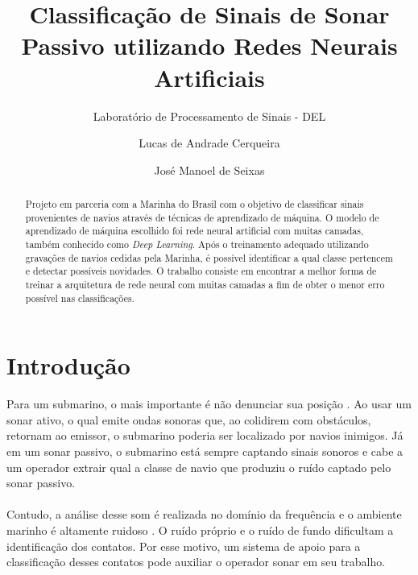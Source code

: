 \documentclass[]{report}
\title{\textbf{Classificação de Sinais de Sonar Passivo utilizando Redes Neurais Artificiais}}
\subtitle{Laboratório de Processamento de Sinais - DEL}
\author{Lucas de Andrade Cerqueira \and José Manoel de Seixas}
\begin{document}
\maketitle

\begin{abstract}
	Projeto em parceria com a Marinha do Brasil com o objetivo de classificar sinais provenientes de navios através de técnicas de aprendizado de máquina. O modelo de aprendizado de máquina escolhido foi rede neural artificial com muitas camadas, também conhecido como \textit{Deep Learning}. Após o treinamento adequado utilizando gravações de navios cedidas pela Marinha, é possível identificar a qual classe pertencem e detectar possíveis novidades. O trabalho consiste em encontrar a melhor forma de treinar a arquitetura de rede neural com muitas camadas a fim de obter o menor erro possível nas classificações.
\end{abstract}
\section*{Introdução}
	Para um submarino, o mais importante é não denunciar sua posição \cite{william1_ref, william2_ref}. Ao usar um sonar ativo, o qual emite ondas sonoras que, ao colidirem com obstáculos, retornam ao emissor, o submarino poderia ser localizado por navios inimigos. Já em um sonar passivo, o submarino está sempre captando sinais sonoros e cabe a um operador extrair qual a classe de navio que produziu o ruído captado pelo sonar passivo. \\\\
	Contudo, a análise desse som é realizada no domínio da frequência e o ambiente marinho é altamente ruidoso \cite{lofargram_ref}. O ruído próprio e o ruído de fundo dificultam a identificação dos contatos. Por esse motivo, um sistema de apoio para a classificação desses contatos pode auxiliar o operador sonar em seu trabalho.
	\vspace{1cm}
\end{document}
